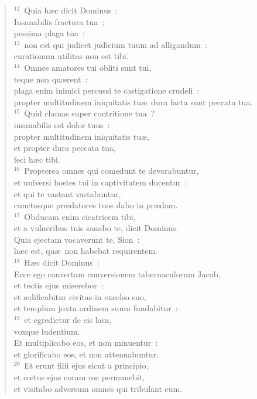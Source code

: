 \begin{flushleft}
\begin{verse}
${}^{12}$~Quia h\ae c dicit Dominus~:\\ Insanabilis fractura tua~;\\ pessima plaga tua~:\\
${}^{13}$~non est qui judicet judicium tuum ad alligandum~:\\ curationum utilitas non est tibi.\\
${}^{14}$~Omnes amatores tui obliti sunt tui,\\ teque non qu\ae rent~:\\ plaga enim inimici percussi te castigatione crudeli~:\\ propter multitudinem iniquitatis tu\ae\ dura facta sunt peccata tua.\\
${}^{15}$~Quid clamas super contritione tua~?\\ insanabilis est dolor tuus~:\\ propter multitudinem iniquitatis tu\ae ,\\ et propter dura peccata tua,\\ feci h\ae c tibi.\\
${}^{16}$~Propterea omnes qui comedunt te devorabuntur,\\ et universi hostes tui in captivitatem ducentur~:\\ et qui te vastant vastabuntur,\\ cunctosque pr\ae datores tuos dabo in pr\ae dam.\\
${}^{17}$~Obducam enim cicatricem tibi,\\ et a vulneribus tuis sanabo te, dicit Dominus.\\ Quia ejectam vocaverunt te, Sion~:\\ h\ae c est, qu\ae\ non habebat requirentem.\\
${}^{18}$~H\ae c dicit Dominus~:\\ Ecce ego convertam conversionem tabernaculorum Jacob,\\ et tectis ejus miserebor~:\\ et \ae dificabitur civitas in excelso suo,\\ et templum juxta ordinem suum fundabitur~:\\
${}^{19}$~et egredietur de eis laus,\\ voxque ludentium.\\ Et multiplicabo eos, et non minuentur~:\\ et glorificabo eos, et non attenuabuntur.\\
${}^{20}$~Et erunt filii ejus sicut a principio,\\ et cœtus ejus coram me permanebit,\\ et visitabo adversum omnes qui tribulant eum.\\

\end{verse}
\end{flushleft}
